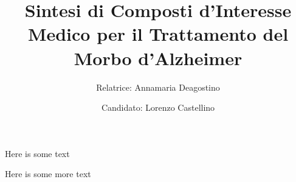 \documentclass{beamer}
\title{Sintesi di Composti d'Interesse Medico per il Trattamento del Morbo d'Alzheimer}
\author{
	Relatrice: Annamaria Deagostino
	\and
	Candidato: Lorenzo Castellino
}
\date{\center{Anno Accademico 2018-2019}}
\begin{document}
\begin{frame}
	\maketitle
\end{frame}

\begin{frame}
	Here is some text
\end{frame}

\begin{frame}
	Here is some more text
\end{frame}
\end{document}
